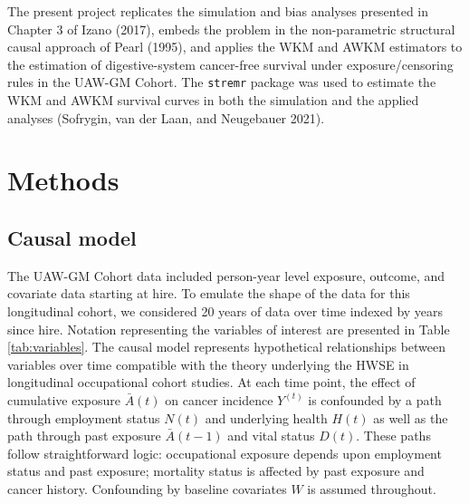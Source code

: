 \documentclass[
  11pt,
]{article}
\begin{document}
The present project replicates the simulation and bias analyses
presented in Chapter 3 of Izano (2017), embeds the problem in the
non-parametric structural causal approach of Pearl (1995), and applies
the WKM and AWKM estimators to the estimation of digestive-system
cancer-free survival under exposure/censoring rules in the UAW-GM
Cohort. The \texttt{stremr} package was used to estimate the WKM and
AWKM survival curves in both the simulation and the applied analyses
(Sofrygin, van der Laan, and Neugebauer 2021).

\hypertarget{methods}{%
\section{Methods}\label{methods}}

\hypertarget{causal-model}{%
\subsection{Causal model}\label{causal-model}}

The UAW-GM Cohort data included person-year level exposure, outcome, and
covariate data starting at hire. To emulate the shape of the data for
this longitudinal cohort, we considered 20 years of data over time
indexed by years since hire. Notation representing the variables of
interest are presented in Table \ref{tab:variables}. The causal model
represents hypothetical relationships between variables over time
compatible with the theory underlying the HWSE in longitudinal
occupational cohort studies. At each time point, the effect of
cumulative exposure \(\bar A(t)\) on cancer incidence \(Y^(t)\) is
confounded by a path through employment status \(N(t)\) and underlying
health \(H(t)\) as well as the path through past exposure
\(\bar A(t - 1)\) and vital status \(D(t)\). These paths follow
straightforward logic: occupational exposure depends upon employment
status and past exposure; mortality status is affected by past exposure
and cancer history. Confounding by baseline covariates \(W\) is assumed
throughout.
\end{document}

